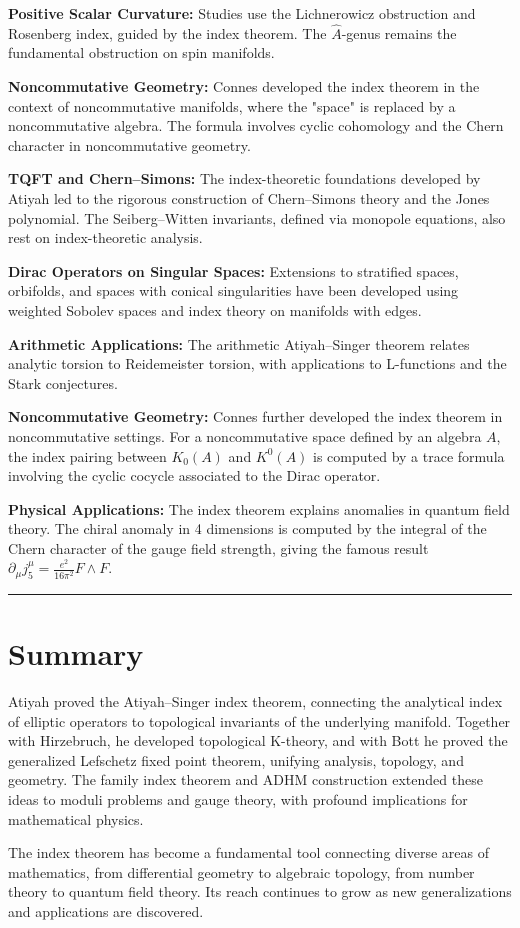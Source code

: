 \textbf{Positive Scalar Curvature:} Studies use the Lichnerowicz obstruction
and Rosenberg index, guided by the index theorem. The $\widehat{A}$-genus
remains the fundamental obstruction on spin manifolds.

\textbf{Noncommutative Geometry:} Connes developed the index theorem in the
context of noncommutative manifolds, where the "space" is replaced by a
noncommutative algebra. The formula involves cyclic cohomology and the Chern
character in noncommutative geometry.

\textbf{TQFT and Chern--Simons:} The index-theoretic foundations developed by
Atiyah led to the rigorous construction of Chern--Simons theory and the
Jones polynomial. The Seiberg--Witten invariants, defined via monopole equations,
also rest on index-theoretic analysis.

\textbf{Dirac Operators on Singular Spaces:} Extensions to stratified spaces,
orbifolds, and spaces with conical singularities have been developed using
weighted Sobolev spaces and index theory on manifolds with edges.

\textbf{Arithmetic Applications:} The arithmetic Atiyah--Singer theorem relates
analytic torsion to Reidemeister torsion, with applications to L-functions
and the Stark conjectures.

\textbf{Noncommutative Geometry:} Connes further developed the index theorem
in noncommutative settings. For a noncommutative space defined by an algebra
$A$, the index pairing between $K_0(A)$ and $K^0(A)$ is computed by a
trace formula involving the cyclic cocycle associated to the Dirac operator.

\textbf{Physical Applications:} The index theorem explains anomalies in
quantum field theory. The chiral anomaly in 4 dimensions is computed by
the integral of the Chern character of the gauge field strength, giving
the famous result $\partial_\mu j^\mu_5 = \frac{e^2}{16\pi^2} F \wedge F$.

\begin{center}\rule{0.5\linewidth}{0.5pt}\end{center}

\section*{Summary}

Atiyah proved the Atiyah--Singer index theorem, connecting the analytical index
of elliptic operators to topological invariants of the underlying manifold.
Together with Hirzebruch, he developed topological K-theory, and with Bott he
proved the generalized Lefschetz fixed point theorem, unifying analysis,
topology, and geometry. The family index theorem and ADHM construction extended
these ideas to moduli problems and gauge theory, with profound implications for
mathematical physics.

The index theorem has become a fundamental tool connecting diverse areas of
mathematics, from differential geometry to algebraic topology, from number
theory to quantum field theory. Its reach continues to grow as new
generalizations and applications are discovered.
